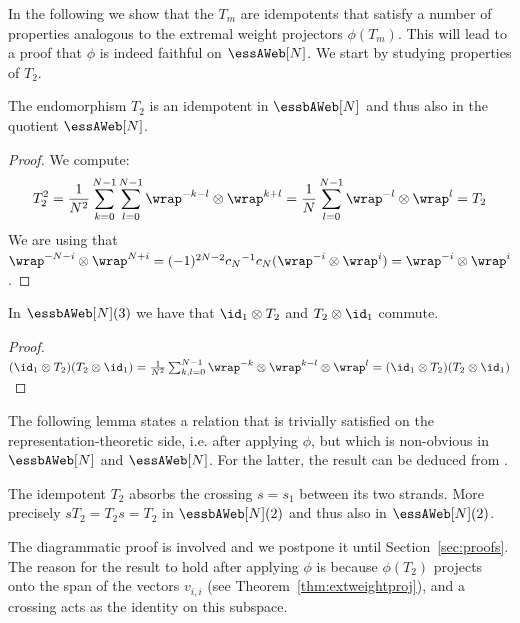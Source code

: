 In the following we show that the $T_m$ are idempotents that satisfy a number of properties analogous to the extremal weight projectors $\phi(T_m)$. This will lead to a proof that $\phi$ is indeed faithful on $\essAWeb[N]$. We start by studying properties of $T_2$.

\begin{lemma} \label{lem_T2idem}The endomorphism $T_2$ is an idempotent in $\essbAWeb[N]$ and thus also in the quotient $\essAWeb[N]$.
\end{lemma}
\begin{proof}
We compute: 
\begin{align*}T_2^2 =  \frac{1}{N^2}\sum_{k=0}^{N-1}\sum_{l=0}^{N-1} \wrap^{-k-l} \otimes \wrap^{k+l} = \frac{1}{N}\sum_{l=0}^{N-1} \wrap^{-l} \otimes \wrap^l =T_2
\end{align*}
We are using that $\wrap^{-N-i}\otimes\wrap^{N+i} = (-1)^{2N-2}{c_N}^{-1}c_N (\wrap^{-i}\otimes\wrap^{i}) =\wrap^{-i}\otimes\wrap^{i}$.
\end{proof}

\begin{lemma} \label{lem:T2comm}
In $\essbAWeb[N](3)$ we have that $\id_1 \otimes T_2$ and $T_2\otimes \id_1$ commute. 
\end{lemma}
\begin{proof}
$(\id_1 \otimes T_2)(T_2\otimes \id_1)= \frac{1}{N^2}\sum_{k,l=0}^{N-1}\wrap^{-k} \otimes \wrap^{k-l}\otimes \wrap^{l} = (\id_1 \otimes T_2)(T_2\otimes \id_1)$
\end{proof}

The following lemma states a relation that is trivially satisfied on the
representation-theoretic side, i.e. after applying $\phi$, but which is
non-obvious in $\essbAWeb[N]$ and $\essAWeb[N]$. For the latter, the result can
be deduced from \cite[Equation (37)]{CK_ann}.

\begin{lemma}\label{lem:crossabs} The idempotent $T_2$ absorbs the crossing
$s=s_1$ between its two strands. More precisely $s T_2 = T_2 s = T_2$  in
$\essbAWeb[N](2)$ and thus also in $\essAWeb[N](2)$.
\end{lemma}

The diagrammatic proof is involved and we postpone it until
Section~\ref{sec:proofs}. The reason for the result to hold after applying
$\phi$ is because $\phi(T_2)$ projects onto the span of the vectors $v_{i,i}$
(see Theorem~\ref{thm:extweightproj}), and a crossing acts as the identity on
this subspace. 



